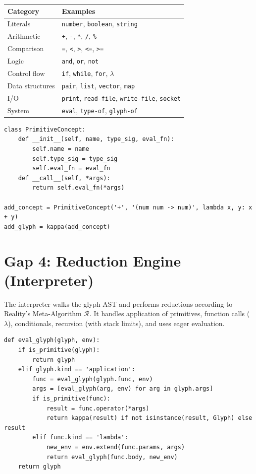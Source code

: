 \documentclass[12pt, letterpaper]{book}
\begin{document}
\begin{center}
\small
\begin{tabular}{ll}
\toprule
\textbf{Category} & \textbf{Examples} \\
\midrule
Literals & \texttt{number}, \texttt{boolean}, \texttt{string} \\
Arithmetic & \texttt{+}, \texttt{-}, \texttt{*}, \texttt{/}, \texttt{\%} \\
Comparison & \texttt{=}, \texttt{<}, \texttt{>}, \texttt{<=}, \texttt{>=} \\
Logic & \texttt{and}, \texttt{or}, \texttt{not} \\
Control flow & \texttt{if}, \texttt{while}, \texttt{for}, $\lambda$ \\
Data structures & \texttt{pair}, \texttt{list}, \texttt{vector}, \texttt{map} \\
I/O & \texttt{print}, \texttt{read-file}, \texttt{write-file}, \texttt{socket} \\
System & \texttt{eval}, \texttt{type-of}, \texttt{glyph-of} \\
\bottomrule
\end{tabular}
\end{center}

\begin{verbatim}
class PrimitiveConcept:
    def __init__(self, name, type_sig, eval_fn):
        self.name = name
        self.type_sig = type_sig
        self.eval_fn = eval_fn
    def __call__(self, *args):
        return self.eval_fn(*args)

add_concept = PrimitiveConcept('+', '(num num -> num)', lambda x, y: x + y)
add_glyph = kappa(add_concept)
\end{verbatim}

\section{Gap 4: Reduction Engine (Interpreter)}

The interpreter walks the glyph AST and performs reductions according to Reality's Meta-Algorithm $\mathcal{R}$. It handles application of primitives, function calls ($\lambda$), conditionals, recursion (with stack limits), and uses eager evaluation.

\begin{verbatim}
def eval_glyph(glyph, env):
    if is_primitive(glyph):
        return glyph
    elif glyph.kind == 'application':
        func = eval_glyph(glyph.func, env)
        args = [eval_glyph(arg, env) for arg in glyph.args]
        if is_primitive(func):
            result = func.operator(*args)
            return kappa(result) if not isinstance(result, Glyph) else result
        elif func.kind == 'lambda':
            new_env = env.extend(func.params, args)
            return eval_glyph(func.body, new_env)
    return glyph
\end{verbatim}
\end{document}
